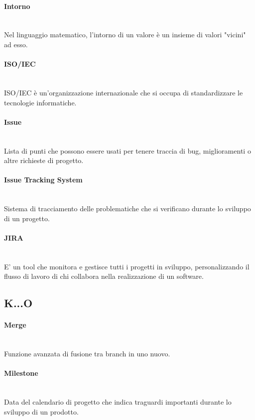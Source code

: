 \paragraph{Intorno}~\smallskip \\
Nel linguaggio matematico, l'intorno di un valore è un insieme di valori "vicini" ad esso.

\paragraph{ISO/IEC}~\smallskip \\
ISO/IEC è un'organizzazione internazionale che si occupa di standardizzare le tecnologie informatiche.

\paragraph{Issue}~\smallskip \\
Lista di punti che possono essere usati per tenere traccia di bug, miglioramenti o altre richieste di progetto.

\paragraph{Issue Tracking System}~\smallskip \\
Sistema di tracciamento delle problematiche che si verificano durante lo sviluppo di un progetto.

\paragraph{JIRA}~\smallskip \\
E' un tool che monitora e gestisce tutti i progetti in sviluppo, personalizzando il flusso di lavoro di chi collabora nella realizzazione di un software.

\subsection{K...O}

\paragraph{Merge}~\smallskip \\
Funzione avanzata di fusione tra branch in uno nuovo.

\paragraph{Milestone}~\smallskip \\
Data del calendario di progetto che indica traguardi importanti durante lo sviluppo di un prodotto.

